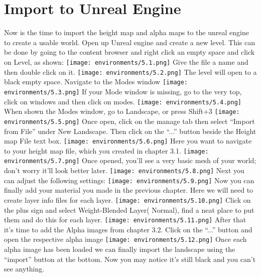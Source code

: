 \documentclass[../main.tex]{subfiles}
\begin{document}
\section {Import to Unreal Engine}
Now is the time to import the height map and alpha maps to the unreal engine to create a usable world.
Open up Unreal engine and create a new level. This can be done by going to the content browser and right click an empty space and click on Level, as shown:
\texttt{[image: environments/5.1.png]}
Give the file a name and then double click on it.
\texttt{[image: environments/5.2.png]}
The level will open to a black empty space. Navigate to the Modes window 
\texttt{[image: environments/5.3.png]}
If your Mode window is missing, go to the very top, click on windows and then click on modes.
\texttt{[image: environments/5.4.png]}
When shown the Modes window, go to Landscape, or press Shift+3
\texttt{[image: environments/5.5.png]}
Once open, click on the manage tab then select “Import from File” under New Landscape. Then click on the “...” button beside the Height map File text box.
\texttt{[image: environments/5.6.png]}
Here you want to navigate to your height map file, which you created in chapter 3.1. 
\texttt{[image: environments/5.7.png]}
Once opened, you’ll see a very basic mesh of your world; don’t worry it’ll look better later.
\texttt{[image: environments/5.8.png]}
Next you can adjust the following settings:
\texttt{[image: environments/5.9.png]}
Now you can finally add your material you made in the previous chapter. Here we will need to create layer info files for each layer.
\texttt{[image: environments/5.10.png]}
Click on the plus sign and select Weight-Blended Layer( Normal), find a neat place to put them and do this for each layer.
\texttt{[image: environments/5.11.png]}
After that it’s time to add the Alpha images from chapter 3.2. Click on the “...” button and open the respective alpha image
\texttt{[image: environments/5.12.png]}
Once each alpha image has been loaded we can finally import the landscape using the “import” button at the bottom.
Now you may notice it’s still black and you can’t see anything.
\end{document}
